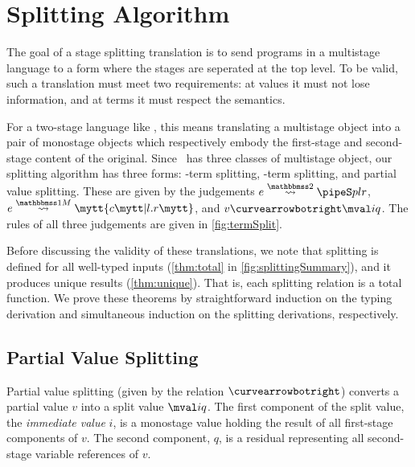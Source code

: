 
\section{Splitting Algorithm}
\label{sec:splitting}



\begin{abstrsyn}

The goal of a stage splitting translation is to send programs in a multistage language
to a form where the stages are seperated at the top level.
To be valid, such a translation must meet two requirements:
at values it must not lose information,
and at terms it must respect the semantics.

For a two-stage language like \lang, this means translating a multistage
object into a pair of monostage objects
which respectively embody the first-stage and second-stage content of the original.
Since \lang\ has three classes of multistage object, 
our splitting algorithm has three forms: 
\bbtwo-term splitting, \bbonem-term splitting, and partial value splitting.
These are given by the judgements $\splittwo e A p l r$, $\splitone e A c {l.r}$, and $v \vsplito \mval i q$.
The rules of all three judgements are given in \ref{fig:termSplit}.

Before discussing the validity of these translations, 
we note that splitting is defined for all well-typed inputs (\ref{thm:total} in \ref{fig:splittingSummary}), and it produces unique results (\ref{thm:unique}).
That is, each splitting relation is a total function.
We prove these theorems by straightforward induction on the typing derivation
and simultaneous induction on the splitting derivations, respectively.

\subsection{Partial Value Splitting}
\label{sec:masking}

Partial value splitting (given by the relation $\vsplito$) converts a 
partial value $v$ into a split value $\mval i q$.
The first component of the split value, the \emph{immediate value} $i$, is a monostage value holding
the result of all first-stage components of $v$.  The second
component, $q$, is a residual representing all second-stage
variable references of $v$.


\end{abstrsyn}
